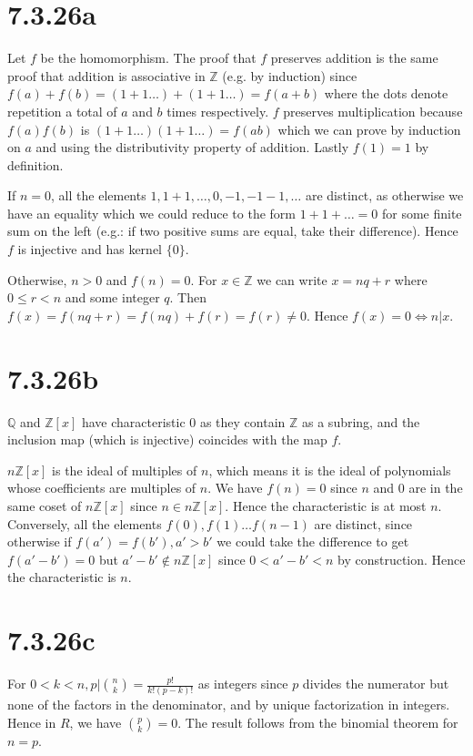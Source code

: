 \documentclass{article}
\def\Z{\mathbb{Z}}
\def\Q{\mathbb{Q}}
\begin{document}
\section*{7.3.26a}

Let $f$ be the homomorphism. The proof that $f$ preserves addition is the same proof that addition is associative in $\Z$ (e.g. by induction) since  $f(a) + f(b) = (1 + 1 \ldots) + (1 + 1 \ldots) = f(a + b)$ where the dots denote repetition a total of $a$ and $b$ times respectively. $f$ preserves multiplication because $f(a)f(b)$ is $(1 + 1 \ldots)(1 + 1 \ldots) = f(ab)$ which we can prove by induction on $a$ and using the distributivity property of addition. Lastly $f(1) = 1$ by definition.

If $n = 0$, all the elements $1, 1+1, \ldots, 0, -1, -1-1, \ldots$ are distinct, as otherwise we have an equality which we could reduce to the form $1 + 1 + \ldots = 0$ for some finite sum on the left (e.g.: if two positive sums are equal, take their difference). Hence $f$ is injective and has kernel $\{0\}$.

Otherwise, $n > 0$ and $f(n) = 0$. For $x \in \Z$ we can write $x = nq + r$ where $0 \le r < n$ and some integer $q$. Then $f(x) = f(nq + r) = f(nq) + f(r) = f(r) \ne 0$. Hence $f(x) = 0 \iff n \vert x$. 

\section*{7.3.26b}

$\Q$ and $\Z[x]$ have characteristic 0 as they contain $\Z$ as a subring, and the inclusion map (which is injective) coincides with the map $f$.

$n\Z[x]$ is the ideal of multiples of $n$, which means it is the ideal of polynomials whose coefficients are multiples of $n$. We have $f(n) = 0$ since $n$ and $0$ are in the same coset of $n\Z[x]$ since $n \in n\Z[x]$. Hence the characteristic is at most $n$. Conversely, all the elements $f(0), f(1) \ldots f(n-1)$ are distinct, since otherwise if $f(a') = f(b'), a' > b'$ we could take the difference to get $f(a' - b') = 0$ but $a' - b' \not\in n\Z[x]$ since $0 < a' - b' < n$ by construction. Hence the characteristic is $n$.

\section*{7.3.26c}

For $0 < k < n, p \vert {n \choose k} = \frac{p!}{k!(p-k)!}$ as integers since $p$ divides the numerator but none of the factors in the denominator, and by unique factorization in integers. Hence in $R$, we have ${p \choose k} = 0$. The result follows from the binomial theorem for $n = p$.
\end{document}

